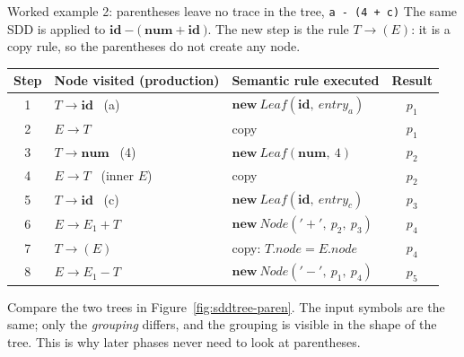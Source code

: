 \documentclass[11pt,a4paper]{article}
\newcommand{\at}[2]{\ensuremath{#1.\mathit{#2}}}
\newcommand{\tok}[1]{\ensuremath{\mathtt{#1}}}
\begin{document}
\begin{examplebox}{Worked example 2: parentheses leave no trace in the tree, \texttt{a - (4 + c)}}
The same SDD is applied to $\mathbf{id}\ \tok{-}\ \tok{(}\ \mathbf{num}\ \tok{+}\ \mathbf{id}\ \tok{)}$. The new step is the rule $T\to(E)$: it is a copy rule, so the parentheses do not create any node.
\begin{center}
\small
\begin{tabular}{@{}c l l c@{}}
\toprule
\textbf{Step} & \textbf{Node visited (production)} & \textbf{Semantic rule executed} & \textbf{Result} \\ \midrule
1 & $T\to\mathbf{id}$ \ (a)   & $\mathbf{new}\ \mathit{Leaf}(\mathbf{id},\ \mathit{entry}_a)$ & $p_1$ \\
2 & $E\to T$                  & copy & $p_1$ \\
3 & $T\to\mathbf{num}$ \ (4)  & $\mathbf{new}\ \mathit{Leaf}(\mathbf{num},\ 4)$ & $p_2$ \\
4 & $E\to T$ \ (inner $E$)    & copy & $p_2$ \\
5 & $T\to\mathbf{id}$ \ (c)   & $\mathbf{new}\ \mathit{Leaf}(\mathbf{id},\ \mathit{entry}_c)$ & $p_3$ \\
6 & $E\to E_1+T$              & $\mathbf{new}\ \mathit{Node}(\tok{'+'},\ p_2,\ p_3)$ & $p_4$ \\
7 & $T\to(E)$                 & copy: $\at{T}{node}=\at{E}{node}$ & $p_4$ \\
8 & $E\to E_1-T$              & $\mathbf{new}\ \mathit{Node}(\tok{'-'},\ p_1,\ p_4)$ & $p_5$ \\ \bottomrule
\end{tabular}
\end{center}
Compare the two trees in Figure~\ref{fig:sddtree-paren}. The input symbols are the same; only the \emph{grouping} differs, and the grouping is visible in the shape of the tree. This is why later phases never need to look at parentheses.


\end{examplebox}
\end{document}
